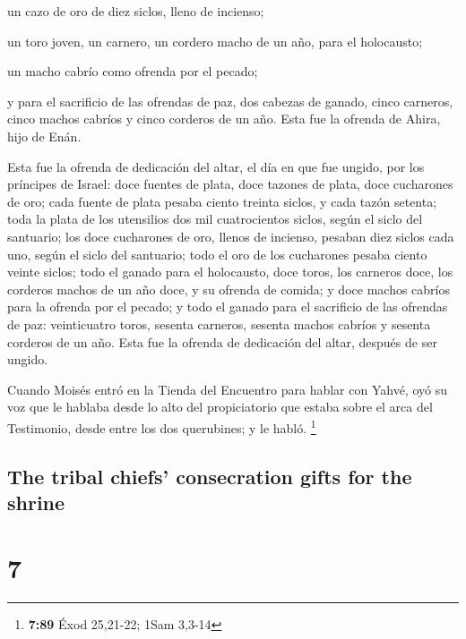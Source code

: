 \begin{paracol}{2}
 un cazo de oro de diez siclos, lleno de incienso;

 un toro joven, un carnero, un cordero macho de un año,
para el holocausto;

 un macho cabrío como ofrenda por el pecado;

 y para el sacrificio de las ofrendas de paz, dos cabezas
de ganado, cinco carneros, cinco machos cabríos y cinco corderos de un
año. Esta fue la ofrenda de Ahira, hijo de Enán.

 Esta fue la ofrenda de dedicación del altar, el día en
que fue ungido, por los príncipes de Israel: doce fuentes de plata, doce
tazones de plata, doce cucharones de oro;  cada fuente de
plata pesaba ciento treinta siclos, y cada tazón setenta; toda la plata
de los utensilios dos mil cuatrocientos siclos, según el siclo del
santuario;  los doce cucharones de oro, llenos de
incienso, pesaban diez siclos cada uno, según el siclo del santuario;
todo el oro de los cucharones pesaba ciento veinte siclos;
 todo el ganado para el holocausto, doce toros, los
carneros doce, los corderos machos de un año doce, y su ofrenda de
comida; y doce machos cabríos para la ofrenda por el pecado;
 y todo el ganado para el sacrificio de las ofrendas de
paz: veinticuatro toros, sesenta carneros, sesenta machos cabríos y
sesenta corderos de un año. Esta fue la ofrenda de dedicación del altar,
después de ser ungido.

 Cuando Moisés entró en la Tienda del Encuentro para
hablar con Yahvé, oyó su voz que le hablaba desde lo alto del
propiciatorio que estaba sobre el arca del Testimonio, desde entre los
dos querubines; y le habló. \footnote{\textbf{7:89} Éxod 25,21-22; 1Sam
  3,3-14}

\switchcolumn
\begin{otherlanguage}{english}

\hypertarget{the-tribal-chiefs-consecration-gifts-for-the-shrine}{%
\subsection{The tribal chiefs' consecration gifts for the
shrine}\label{the-tribal-chiefs-consecration-gifts-for-the-shrine}}

\hypertarget{section-13}{%
\section{7}\label{section-13}}


\end{otherlanguage}
\end{paracol}
